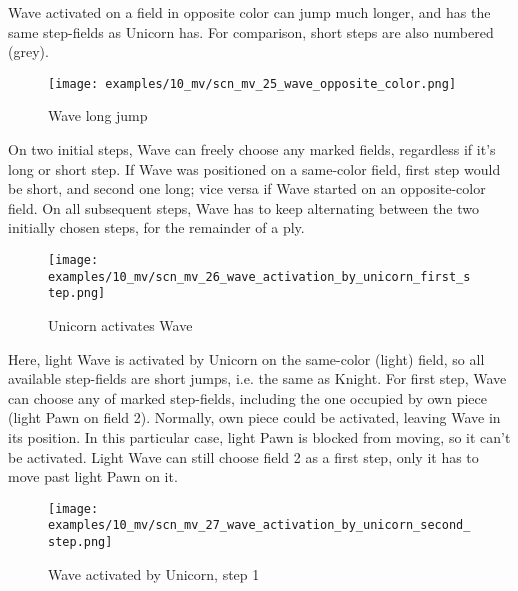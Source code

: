 Wave activated on a field in opposite color can jump much longer, and has the same step-fields
as Unicorn has. For comparison, short steps are also numbered (grey).

\vspace*{0.7\baselineskip}
\noindent
\begin{wrapfigure}[18]{l}{0.7\textwidth}
\centering
\texttt{[image: examples/10\_mv/scn\_mv\_25\_wave\_opposite\_color.png]}
\vspace*{-0.3\baselineskip}
\caption{Wave long jump}
\label{fig:scn_mv_25_wave_opposite_color}
\end{wrapfigure}
On two initial steps, Wave can freely choose any marked fields, regardless if it's long or short step.
If Wave was positioned on a same-color field, first step would be short, and second one long; vice versa
if Wave started on an opposite-color field. On all subsequent steps, Wave has to keep alternating between
the two initially chosen steps, for the remainder of a ply.

\clearpage %

\vspace*{-2.1\baselineskip}
\noindent
\begin{figure}[!h]
\texttt{[image: examples/10\_mv/scn\_mv\_26\_wave\_activation\_by\_unicorn\_first\_step.png]}
\vspace*{-1.3\baselineskip}
\caption{Unicorn activates Wave}
\label{fig:scn_mv_26_wave_activation_by_unicorn_first_step}
\end{figure}

\vspace*{-0.3\baselineskip}
Here, light Wave is activated by Unicorn on the same-color (light) field, so all available
step-fields are short jumps, i.e. the same as Knight. For first step, Wave can choose any of
marked step-fields, including the one occupied by own piece (light Pawn on field 2). Normally,
own piece could be activated, leaving Wave in its position. In this particular case, light Pawn
is blocked from moving, so it can't be activated. Light Wave can still choose field 2 as a first
step, only it has to move past light Pawn on it.

\clearpage %

\vspace*{-2.1\baselineskip}
\noindent
\begin{figure}[!h]
\texttt{[image: examples/10\_mv/scn\_mv\_27\_wave\_activation\_by\_unicorn\_second\_step.png]}
\caption{Wave activated by Unicorn, step 1}
\label{fig:scn_mv_27_wave_activation_by_unicorn_second_step}
\end{figure}

